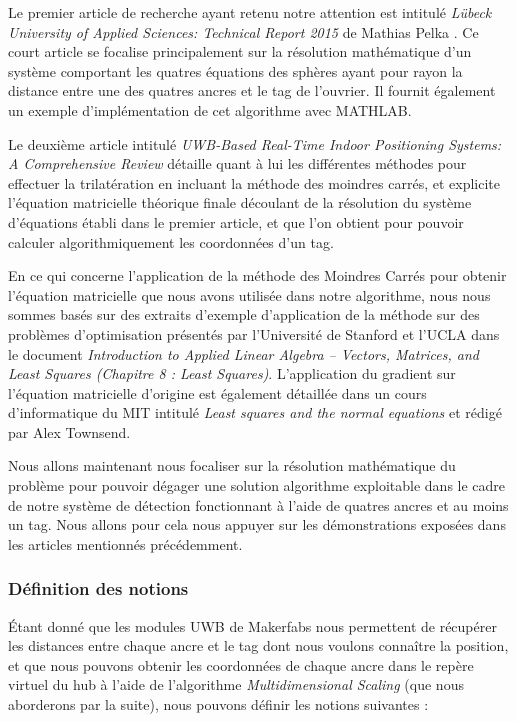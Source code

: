 Le premier article de recherche ayant retenu notre attention est intitulé \emph{Lübeck University of Applied Sciences: Technical Report 2015} de Mathias Pelka \cite{trilateration_ref_1}. Ce court article se focalise principalement sur la résolution mathématique d'un système comportant les quatres équations des sphères ayant pour rayon la distance entre une des quatres ancres et le tag de l'ouvrier. Il fournit également un exemple d'implémentation de cet algorithme avec MATHLAB.

Le deuxième article intitulé \emph{UWB-Based Real-Time Indoor Positioning Systems: A
Comprehensive Review} \cite{trilateration_ref_2} détaille quant à lui les différentes méthodes pour effectuer la trilatération en incluant la méthode des moindres carrés, et explicite l'équation matricielle théorique finale découlant de la résolution du système d'équations établi dans le premier article, et que l'on obtient pour pouvoir calculer algorithmiquement les coordonnées d'un tag.

En ce qui concerne l'application de la méthode des Moindres Carrés pour obtenir l'équation matricielle que nous avons utilisée dans notre algorithme, nous nous sommes basés sur des extraits d'exemple d'application de la méthode sur des problèmes d'optimisation présentés par l'Université de Stanford et l'UCLA dans le document \emph{Introduction to Applied Linear Algebra – Vectors, Matrices, and Least Squares (Chapitre 8 : Least Squares)}\cite{trilateration_ref_3}. L'application du gradient sur l'équation matricielle d'origine est également détaillée dans un cours d'informatique du MIT intitulé \emph{Least squares and the normal equations} et rédigé par Alex Townsend\cite{trilateration_ref_4}.

\bigskip

Nous allons maintenant nous focaliser sur la résolution mathématique du problème pour pouvoir dégager une solution algorithme exploitable dans le cadre de notre système de détection fonctionnant à l'aide de quatres ancres et au moins un tag. Nous allons pour cela nous appuyer sur les démonstrations exposées dans les articles mentionnés précédemment.

\subsubsection{Définition des notions}

Étant donné que les modules UWB de Makerfabs nous permettent de récupérer les distances entre chaque ancre et le tag dont nous voulons connaître la position, et que nous pouvons obtenir les coordonnées de chaque ancre dans le repère virtuel du hub à l'aide de l'algorithme \emph{Multidimensional Scaling} (que nous aborderons par la suite), nous pouvons définir les notions suivantes :

